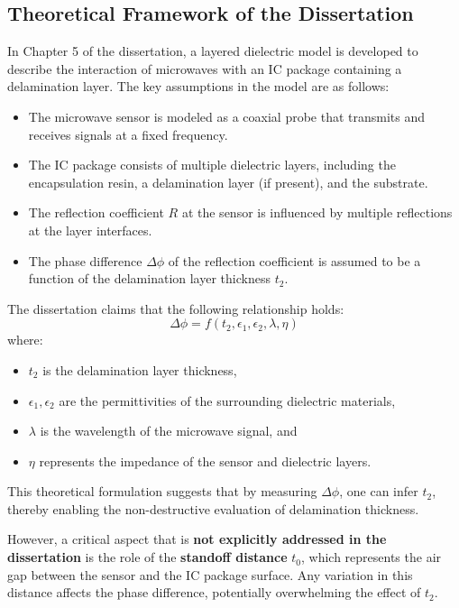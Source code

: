 \documentclass[10pt,twocolumn]{article}
\begin{document}
\subsection{Theoretical Framework of the Dissertation}

In Chapter 5 of the dissertation, a layered dielectric model is developed to describe the interaction of microwaves with an IC package containing a delamination layer. The key assumptions in the model are as follows:

\begin{itemize}
    \item The microwave sensor is modeled as a coaxial probe that transmits and receives signals at a fixed frequency.
    \item The IC package consists of multiple dielectric layers, including the encapsulation resin, a delamination layer (if present), and the substrate.
    \item The reflection coefficient \( R \) at the sensor is influenced by multiple reflections at the layer interfaces.
    \item The phase difference \( \Delta \phi \) of the reflection coefficient is assumed to be a function of the delamination layer thickness \( t_2 \).
\end{itemize}

The dissertation claims that the following relationship holds:
\[
\Delta \phi = f(t_2, \epsilon_1, \epsilon_2, \lambda, \eta)
\]
where:
\begin{itemize}
    \item \( t_2 \) is the delamination layer thickness,
    \item \( \epsilon_1, \epsilon_2 \) are the permittivities of the surrounding dielectric materials,
    \item \( \lambda \) is the wavelength of the microwave signal, and
    \item \( \eta \) represents the impedance of the sensor and dielectric layers.
\end{itemize}

This theoretical formulation suggests that by measuring \( \Delta \phi \), one can infer \( t_2 \), thereby enabling the non-destructive evaluation of delamination thickness.

However, a critical aspect that is \textbf{not explicitly addressed in the dissertation} is the role of the \textbf{standoff distance} \( t_0 \), which represents the air gap between the sensor and the IC package surface. Any variation in this distance affects the phase difference, potentially overwhelming the effect of \( t_2 \).
\end{document}

